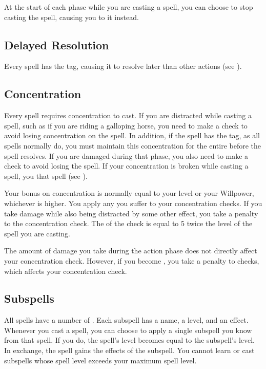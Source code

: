          At the start of each phase while you are casting a spell, you can choose to stop casting the spell, causing you to  it instead.

    \subsection{Delayed Resolution}\label{Delayed Resolution}
        Every spell has the  tag, causing it to resolve later than other actions (see ).

    \subsection{Concentration}\label{Concentration}
        Every spell requires concentration to cast.
        If you are distracted while casting a spell, such as if you are riding a galloping horse, you need to make a  check to avoid losing concentration on the spell.
        In addition, if the spell has the  tag, as all spells normally do, you must maintain this concentration for the entire  before the spell resolves.
        If you are damaged during that phase, you also need to make a  check to avoid losing the spell.
        If your concentration is broken while casting a spell, you  that spell (see ).

        Your bonus on concentration  is normally equal to your level or your Willpower, whichever is higher.
        You apply any  you suffer to your concentration checks.
        If you take damage while also being distracted by some other effect, you take a  penalty to the concentration check.
        The  of the check is equal to 5 \add twice the level of the spell you are casting.

        The amount of damage you take during the action phase does not directly affect your concentration check.
        However, if you become , you take a  penalty to checks, which affects your concentration check.

    \subsection{Subspells}
        All spells have a number of .
        Each subspell has a name, a level, and an effect.
        Whenever you cast a spell, you can choose to apply a single subspell you know from that spell.
        If you do, the spell's level becomes equal to the subspell's level.
        In exchange, the spell gains the effects of the subspell.
        You cannot learn or cast subspells whose spell level exceeds your maximum spell level.

